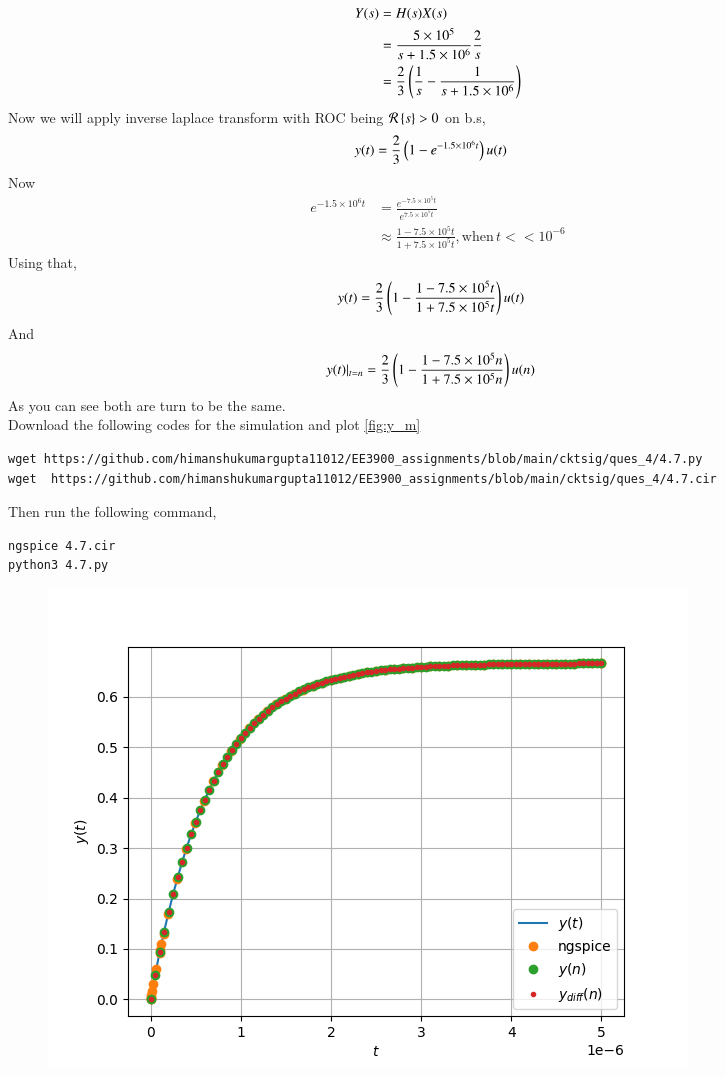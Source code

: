 \documentclass[journal,12pt,twocolumn]{IEEEtran}
\renewcommand\thesection{\arabic{section}}
\begin{document}
\begin{enumerate}[label=\arabic*.,ref=\thesection.\theenumi]
\begin{align}
		     Y(s) &= H(s)X(s) \\
			  &=\frac{5 \times 10^5}{s + 1.5 \times 10^6}\frac{2}{s} \\
			  &= \frac{2}{3}\left(\frac{1}{s} - \frac{1}{s + 1.5 \times 10^6}\right)
	     \end{align}
	     Now we will apply inverse laplace transform with ROC being $\mathcal{R}\left\{s\right\} > 0$ on b.s,
	      \begin{align}
	           y(t) &= \frac{2}{3}\left(1 - e^{-1.5\times 10^6t}\right)u(t)
              \end{align}
               Now 
	        \begin{align}
			e^{-1.5 \times 10^6t} &= \frac{e^{-7.5 \times 10^5t}}{e^{7.5 \times 10^5t}} \\
			&\approx \frac{1 - 7.5\times10^5t}{1 + 7.5\times10^5t} , \text{when}\, t << 10^{-6}
		\end{align}
	Using that,
	     \begin{align}
		     y(t) &= \frac{2}{3}\left(1 - \frac{1 - 7.5\times10^5t}{1 + 7.5\times10^5t}\right)u(t)
	     \end{align}
	     And 
	      \begin{align}
		      y(t)\vert_{t = n} &= \frac{2}{3}\left(1 - \frac{1 - 7.5\times10^5n}{1 + 7.5\times10^5n}\right)u(n)
              \end{align}
          As you can see both are turn to be the same.\\
	  Download the following codes for the simulation and plot \ref{fig:y_m} 
	   \begin{lstlisting}
wget https://github.com/himanshukumargupta11012/EE3900_assignments/blob/main/cktsig/ques_4/4.7.py
wget  https://github.com/himanshukumargupta11012/EE3900_assignments/blob/main/cktsig/ques_4/4.7.cir
           \end{lstlisting}
	   Then run the following command,
	\begin{lstlisting}
ngspice 4.7.cir
python3 4.7.py
        \end{lstlisting}
        \begin{figure}[!ht]
		\centering
		\includegraphics[width = \columnwidth]{./ques_4/4.7.png}

\end{figure}
\end{enumerate}
\end{document}
